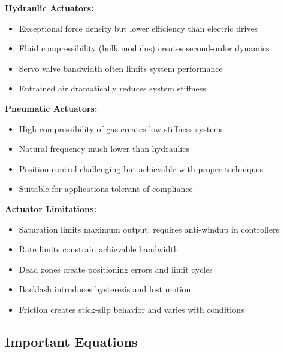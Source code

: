 \textbf{Hydraulic Actuators:}
\begin{itemize}
    \item Exceptional force density but lower efficiency than electric drives
    \item Fluid compressibility (bulk modulus) creates second-order dynamics
    \item Servo valve bandwidth often limits system performance
    \item Entrained air dramatically reduces system stiffness
\end{itemize}

\textbf{Pneumatic Actuators:}
\begin{itemize}
    \item High compressibility of gas creates low stiffness systems
    \item Natural frequency much lower than hydraulics
    \item Position control challenging but achievable with proper techniques
    \item Suitable for applications tolerant of compliance
\end{itemize}

\textbf{Actuator Limitations:}
\begin{itemize}
    \item Saturation limits maximum output; requires anti-windup in controllers
    \item Rate limits constrain achievable bandwidth
    \item Dead zones create positioning errors and limit cycles
    \item Backlash introduces hysteresis and lost motion
    \item Friction creates stick-slip behavior and varies with conditions
\end{itemize}

\subsection{Important Equations}

